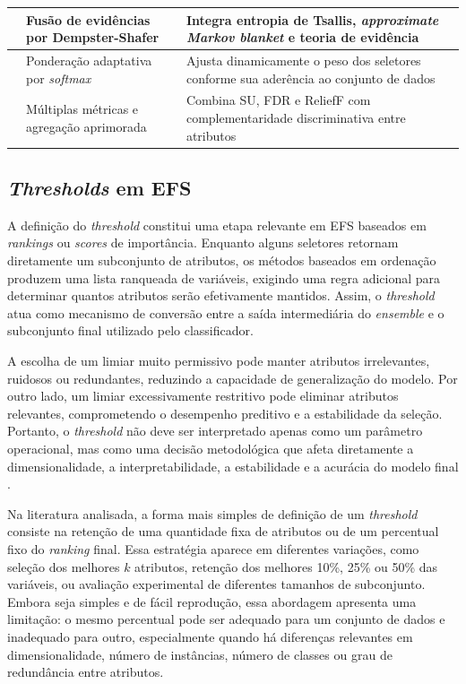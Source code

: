 \begin{longtable}{P{2.8cm}P{4.8cm}P{5.9cm}}
 &
Fusão de evidências por Dempster-Shafer &
Integra entropia de Tsallis, \textit{approximate Markov blanket} e teoria de evidência \\ \hline

 &
Ponderação adaptativa por \textit{softmax} &
Ajusta dinamicamente o peso dos seletores conforme sua aderência ao conjunto de dados \\ \hline

 &
Múltiplas métricas e agregação aprimorada &
Combina SU, FDR e ReliefF com complementaridade discriminativa entre atributos \\

\end{longtable}
\normalsize


\subsection{\textit{Thresholds} em EFS}\label{subsec:thresholds-efs}

A definição do \textit{threshold} constitui uma etapa relevante em EFS baseados em \textit{rankings} ou \textit{scores} de importância. Enquanto alguns seletores retornam diretamente um subconjunto de atributos, os métodos baseados em ordenação produzem uma lista ranqueada de variáveis, exigindo uma regra adicional para determinar quantos atributos serão efetivamente mantidos. Assim, o \textit{threshold} atua como mecanismo de conversão entre a saída intermediária do \textit{ensemble} e o subconjunto final utilizado pelo classificador.

A escolha de um limiar muito permissivo pode manter atributos irrelevantes, ruidosos ou redundantes, reduzindo a capacidade de generalização do modelo. Por outro lado, um limiar excessivamente restritivo pode eliminar atributos relevantes, comprometendo o desempenho preditivo e a estabilidade da seleção. Portanto, o \textit{threshold} não deve ser interpretado apenas como um parâmetro operacional, mas como uma decisão metodológica que afeta diretamente a dimensionalidade, a interpretabilidade, a estabilidade e a acurácia do modelo final \cite{bolon2018scalability,seijopardo2019automatic,abasabadi2021automatic}.

Na literatura analisada, a forma mais simples de definição de um \textit{threshold} consiste na retenção de uma quantidade fixa de atributos ou de um percentual fixo do \textit{ranking} final. Essa estratégia aparece em diferentes variações, como seleção dos melhores $k$ atributos, retenção dos melhores 10\%, 25\% ou 50\% das variáveis, ou avaliação experimental de diferentes tamanhos de subconjunto. Embora seja simples e de fácil reprodução, essa abordagem apresenta uma limitação: o mesmo percentual pode ser adequado para um conjunto de dados e inadequado para outro, especialmente quando há diferenças relevantes em dimensionalidade, número de instâncias, número de classes ou grau de redundância entre atributos.

